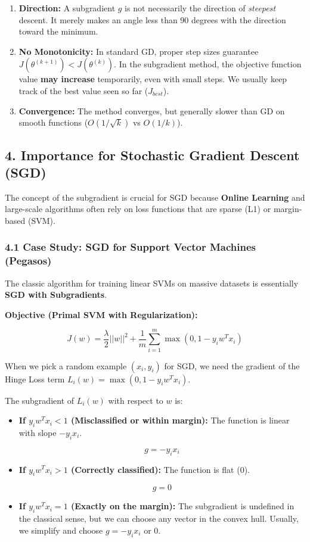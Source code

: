 \documentclass[
  italian,
  11pt,
]{article}
\begin{document}
\begin{enumerate}
\def\labelenumi{\arabic{enumi}.}
\item
  \textbf{Direction:} A subgradient \(g\) is not necessarily the
  direction of \emph{steepest} descent. It merely makes an angle less
  than 90 degrees with the direction toward the minimum.
\item
  \textbf{No Monotonicity:} In standard GD, proper step sizes guarantee
  \(J(\theta^{(k+1)}) < J(\theta^{(k)})\). In the subgradient method,
  the objective function value \textbf{may increase} temporarily, even
  with small steps. We usually keep track of the best value seen so far
  (\(J_{best}\)).
\item
  \textbf{Convergence:} The method converges, but generally slower than
  GD on smooth functions (\(O(1/\sqrt{k})\) vs \(O(1/k)\)).
\end{enumerate}

\subsection{4. Importance for Stochastic Gradient Descent
(SGD)}\label{importance-for-stochastic-gradient-descent-sgd}

The concept of the subgradient is crucial for SGD because \textbf{Online
Learning} and large-scale algorithms often rely on loss functions that
are sparse (L1) or margin-based (SVM).

\subsubsection{4.1 Case Study: SGD for Support Vector Machines
(Pegasos)}\label{case-study-sgd-for-support-vector-machines-pegasos}

The classic algorithm for training linear SVMs on massive datasets is
essentially \textbf{SGD with Subgradients}.

\textbf{Objective (Primal SVM with Regularization):}

\[J(w) = \frac{\lambda}{2} ||w||^2 + \frac{1}{m} \sum_{i=1}^m \max(0, 1 - y_i w^T x_i)\]

When we pick a random example \((x_i, y_i)\) for SGD, we need the
gradient of the Hinge Loss term \(L_i(w) = \max(0, 1 - y_i w^T x_i)\).

The subgradient of \(L_i(w)\) with respect to \(w\) is:

\begin{itemize}
\item
  \textbf{If \(y_i w^T x_i < 1\) (Misclassified or within margin):} The
  function is linear with slope \(-y_i x_i\).

  \[g = -y_i x_i\]
\item
  \textbf{If \(y_i w^T x_i > 1\) (Correctly classified):} The function
  is flat (0).

  \[g = 0\]
\item
  \textbf{If \(y_i w^T x_i = 1\) (Exactly on the margin):} The
  subgradient is undefined in the classical sense, but we can choose any
  vector in the convex hull. Usually, we simplify and choose
  \(g = -y_i x_i\) or \(0\).
\end{itemize}
\end{document}
